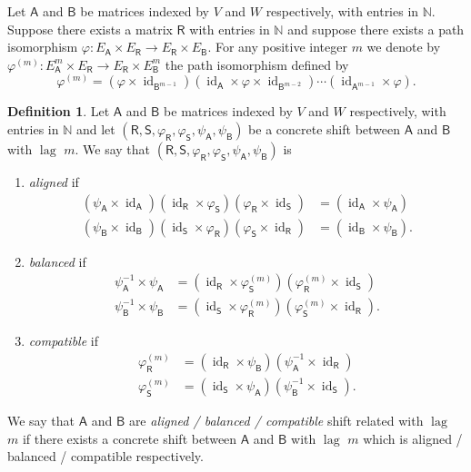 \documentclass[11pt, letterpaper,final]{amsart}
\newcommand{\bbN}{{\mathbb{N}}}
\newcommand{\id}{\operatorname{id}}
\newcommand{\lag}{\operatorname{lag}}
\theoremstyle{definition}
\newtheorem{dfn}[thm]{Definition}
\begin{document}
Let $\mathsf{A}$ and $\mathsf{B}$ be matrices indexed by $V$ and $W$ respectively, with entries in $\bbN$.  Suppose there exists a matrix $\mathsf{R}$ with entries in $\bbN$ and suppose there exists a path isomorphism $\varphi \colon E_\mathsf{A} \times E_\mathsf{R} \to E_\mathsf{R} \times E_\mathsf{B}$.  For any positive integer $m$ we denote by $\varphi^{(m)} : E_\mathsf{A}^m \times E_\mathsf{R} \rightarrow E_\mathsf{R} \times E_\mathsf{B}^m$ the path isomorphism defined by 
$$
\varphi^{(m)} = (\varphi \times \id_{\mathsf{B}^{m-1}} )(\id_\mathsf{A} \times \varphi \times \id_{\mathsf{B}^{m-2}} ) \cdots (\id_{\mathsf{A}^{m-1}} \times \varphi).
$$

\begin{dfn}\label{dfn-relation-matrices}
Let $\mathsf{A}$ and $\mathsf{B}$ be matrices indexed by $V$ and $W$ respectively, with entries in $\bbN$ and let $(\mathsf{R},\mathsf{S}, \varphi_\mathsf{R}, \varphi_\mathsf{S}, \psi_\mathsf{A}, \psi_\mathsf{B})$ be a concrete shift between $\mathsf{A}$ and $\mathsf{B}$ with $\lag$ $m$. We say that $(\mathsf{R}, \mathsf{S}, \varphi_\mathsf{R}, \varphi_\mathsf{S}, \psi_\mathsf{A}, \psi_\mathsf{B})$ is
\begin{enumerate}
\item \emph{aligned} if 
\begin{align*}
    (\psi_\mathsf{A} \times \id_\mathsf{A})(\id_\mathsf{R} \times \varphi_\mathsf{S})(\varphi_\mathsf{R} \times \id_\mathsf{S}) &= (\id_\mathsf{A} \times \psi_\mathsf{A}) \\
    (\psi_\mathsf{B} \times \id_\mathsf{B})(\id_\mathsf{S} \times \varphi_\mathsf{R})(\varphi_\mathsf{S} \times \id_\mathsf{R}) &= (\id_\mathsf{B} \times \psi_\mathsf{B}).
\end{align*}
		
\item \emph{balanced} if 
\begin{align*}
\psi_\mathsf{A}^{-1} \times \psi_\mathsf{A} &= (\id_\mathsf{R} \times \varphi_\mathsf{S}^{(m)}) ( \varphi_\mathsf{R}^{(m)} \times \id_\mathsf{S})  \\
\psi_\mathsf{B}^{-1} \times \psi_\mathsf{B} &= (\id_\mathsf{S} \times \varphi_\mathsf{R}^{(m)}) ( \varphi_\mathsf{S}^{(m)} \times \id_\mathsf{R}).
\end{align*}
		
\item \emph{compatible} if 
\begin{align*}
\varphi_\mathsf{R}^{(m)} &= (\id_\mathsf{R} \times \psi_\mathsf{B})(\psi_\mathsf{A}^{-1} \times \id_\mathsf{R} ) \\  
\varphi_\mathsf{S}^{(m)} &= (\id_\mathsf{S} \times \psi_\mathsf{A})(\psi_\mathsf{B}^{-1} \times \id_\mathsf{S} ).
\end{align*}

\end{enumerate}
We say that $\mathsf{A}$ and $\mathsf{B}$ are \emph{aligned /  balanced / compatible} shift related with $\lag$ $m$ if there exists a concrete shift between $\mathsf{A}$ and $\mathsf{B}$ with $\lag$ $m$ which is aligned /  balanced / compatible respectively.
\end{dfn}
\end{document}
